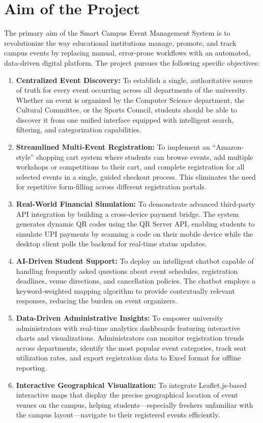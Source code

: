 \documentclass[12pt,a4paper]{report}
\begin{document}
\section{Aim of the Project}

The primary aim of the Smart Campus Event Management System is to revolutionize the way educational institutions manage, promote, and track campus events by replacing manual, error-prone workflows with an automated, data-driven digital platform. The project pursues the following specific objectives:

\begin{enumerate}
    \item \textbf{Centralized Event Discovery:} To establish a single, authoritative source of truth for every event occurring across all departments of the university. Whether an event is organized by the Computer Science department, the Cultural Committee, or the Sports Council, students should be able to discover it from one unified interface equipped with intelligent search, filtering, and categorization capabilities.

    \item \textbf{Streamlined Multi-Event Registration:} To implement an ``Amazon-style'' shopping cart system where students can browse events, add multiple workshops or competitions to their cart, and complete registration for all selected events in a single, guided checkout process. This eliminates the need for repetitive form-filling across different registration portals.

    \item \textbf{Real-World Financial Simulation:} To demonstrate advanced third-party API integration by building a cross-device payment bridge. The system generates dynamic QR codes using the QR Server API, enabling students to simulate UPI payments by scanning a code on their mobile device while the desktop client polls the backend for real-time status updates.

    \item \textbf{AI-Driven Student Support:} To deploy an intelligent chatbot capable of handling frequently asked questions about event schedules, registration deadlines, venue directions, and cancellation policies. The chatbot employs a keyword-weighted mapping algorithm to provide contextually relevant responses, reducing the burden on event organizers.

    \item \textbf{Data-Driven Administrative Insights:} To empower university administrators with real-time analytics dashboards featuring interactive charts and visualizations. Administrators can monitor registration trends across departments, identify the most popular event categories, track seat utilization rates, and export registration data to Excel format for offline reporting.

    \item \textbf{Interactive Geographical Visualization:} To integrate Leaflet.js-based interactive maps that display the precise geographical location of event venues on the campus, helping students---especially freshers unfamiliar with the campus layout---navigate to their registered events efficiently.
\end{enumerate}
\end{document}
